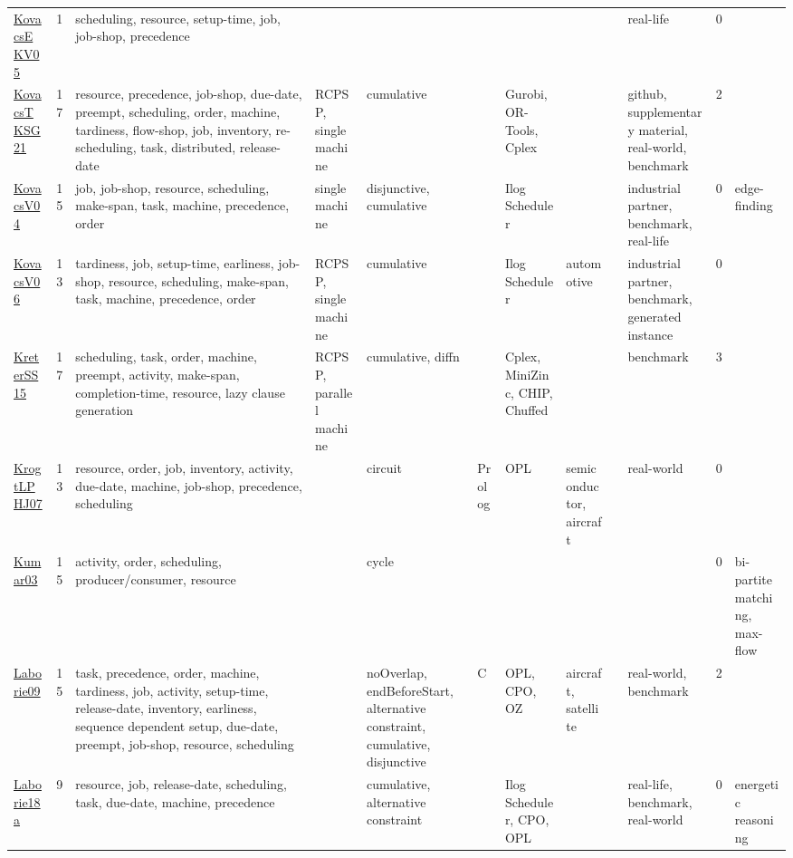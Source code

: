 {\begin{longtable}{p{3cm}rp{4cm}p{1.5cm}p{2cm}p{1.5cm}p{1.5cm}p{1.5cm}p{1.5cm}p{2cm}rp{1.5cm}}
\href{papers/KovacsEKV05.pdf}{KovacsEKV05}~\cite{KovacsEKV05} & 1 & scheduling, resource, setup-time, job, job-shop, precedence &  &  &  &  &  &  & real-life & 0 & \\
\href{papers/KovacsTKSG21.pdf}{KovacsTKSG21}~\cite{KovacsTKSG21} & 17 & resource, precedence, job-shop, due-date, preempt, scheduling, order, machine, tardiness, flow-shop, job, inventory, re-scheduling, task, distributed, release-date & RCPSP, single machine & cumulative &  & Gurobi, OR-Tools, Cplex &  &  & github, supplementary material, real-world, benchmark & 2 & \\
\href{papers/KovacsV04.pdf}{KovacsV04}~\cite{KovacsV04} & 15 & job, job-shop, resource, scheduling, make-span, task, machine, precedence, order & single machine & disjunctive, cumulative &  & Ilog Scheduler &  &  & industrial partner, benchmark, real-life & 0 & edge-finding\\
\href{papers/KovacsV06.pdf}{KovacsV06}~\cite{KovacsV06} & 13 & tardiness, job, setup-time, earliness, job-shop, resource, scheduling, make-span, task, machine, precedence, order & RCPSP, single machine & cumulative &  & Ilog Scheduler & automotive &  & industrial partner, benchmark, generated instance & 0 & \\
\href{papers/KreterSS15.pdf}{KreterSS15}~\cite{KreterSS15} & 17 & scheduling, task, order, machine, preempt, activity, make-span, completion-time, resource, lazy clause generation & RCPSP, parallel machine & cumulative, diffn &  & Cplex, MiniZinc, CHIP, Chuffed &  &  & benchmark & 3 & \\
\href{papers/KrogtLPHJ07.pdf}{KrogtLPHJ07}~\cite{KrogtLPHJ07} & 13 & resource, order, job, inventory, activity, due-date, machine, job-shop, precedence, scheduling &  & circuit & Prolog & OPL & semiconductor, aircraft &  & real-world & 0 & \\
\href{papers/Kumar03.pdf}{Kumar03}~\cite{Kumar03} & 15 & activity, order, scheduling, producer/consumer, resource &  & cycle &  &  &  &  &  & 0 & bi-partite matching, max-flow\\
\href{papers/Laborie09.pdf}{Laborie09}~\cite{Laborie09} & 15 & task, precedence, order, machine, tardiness, job, activity, setup-time, release-date, inventory, earliness, sequence dependent setup, due-date, preempt, job-shop, resource, scheduling &  & noOverlap, endBeforeStart, alternative constraint, cumulative, disjunctive & C  & OPL, CPO, OZ & aircraft, satellite &  & real-world, benchmark & 2 & \\
\href{papers/Laborie18a.pdf}{Laborie18a}~\cite{Laborie18a} & 9 & resource, job, release-date, scheduling, task, due-date, machine, precedence &  & cumulative, alternative constraint &  & Ilog Scheduler, CPO, OPL &  &  & real-life, benchmark, real-world & 0 & energetic reasoning\\

\end{longtable}}
